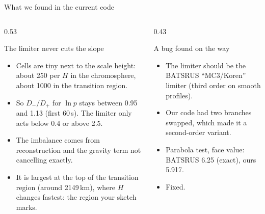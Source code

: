 \documentclass[aspectratio=169,11pt]{beamer}
\begin{document}
\begin{frame}{What we found in the current code}
  \begin{columns}[T,onlytextwidth]
    \begin{column}{0.53\textwidth}
      \begin{block}{The limiter never cuts the slope}
        \small
        \begin{itemize}
          \item Cells are tiny next to the scale height: about 250 per $H$ in the
                chromosphere, about 1000 in the transition region.
          \item So $D_-/D_+$ for $\ln p$ stays between 0.95 and 1.13 (first 60\,s).
                The limiter only acts below 0.4 or above 2.5.
          \item The imbalance comes from reconstruction and the gravity term
                not cancelling exactly.
          \item It is largest at the top of the transition region
                (around 2149\,km), where $H$ changes fastest:
                the region your sketch marks.
        \end{itemize}
      \end{block}
    \end{column}
    \begin{column}{0.43\textwidth}
      \begin{block}{A bug found on the way}
        \small
        \begin{itemize}
          \item The limiter should be the BATSRUS ``MC3/Koren'' limiter
                (third order on smooth profiles).
          \item Our code had two branches swapped, which made it a
                second-order variant.
          \item Parabola test, face value:\\
                BATSRUS 6.25 (exact), ours 5.917.
          \item \alert{Fixed.}
        \end{itemize}
      \end{block}
    \end{column}
  \end{columns}
\end{frame}
\end{document}
